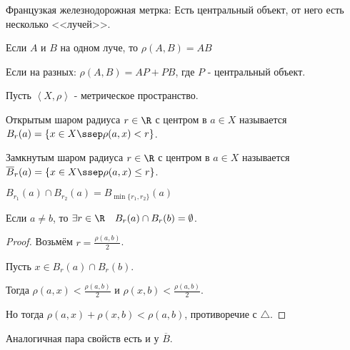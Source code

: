 \begin{example} \thmslashn

    Французкая железнодорожная метрка: Есть центральный объект, от него есть несколько <<лучей>>. 

    Если $A$ и $B$ на одном луче, то $\rho(A, B) = AB$

    Если на разных: $\rho(A, B) = AP + PB$, где $P$ - центральный объект.

\end{example}
\begin{definition} \thmslashn 

    Пусть $\left<X, \rho\right>$ - метрическое пространство.

    Открытым шаром радиуса $r\in \R$ с центром в $a\in X$ называется $B_r(a) = \{x\in X \ssep \rho(a, x) < r\}$.
    
    Замкнутым шаром радиуса $r\in \R$ с центром в $a\in X$ называется $\overline{B}_r(a) = \{x\in X \ssep \rho(a, x) \le  r\}$.
\end{definition}
\begin{properties} \thmslashn

    $B_{r_1}(a)\cap B_{r_2}(a) = B_{\min \{r_1, r_2\} }(a)$ 

    Если $a \neq b$, то $\exists{r\in \R}\quad B_{r}(a)\cap B_{r}(b) = \emptyset$.
    \begin{proof} \thmslashn
    
        Возьмём $r = \frac{\rho(a, b)}{2}$.

        Пусть $x\in B_{r}(a)\cap B_{r}(b)$.

        Тогда $\rho(a, x) < \frac{\rho(a, b)}{2}$ и $\rho(x, b) < \frac{\rho(a, b)}{2}$.

        Но тогда $\rho(a, x) + \rho(x, b) < \rho(a, b)$, противоречие с $\triangle$.
    \end{proof}

    Аналогичная пара свойств есть и у $\overline{B}$.
\end{properties}
